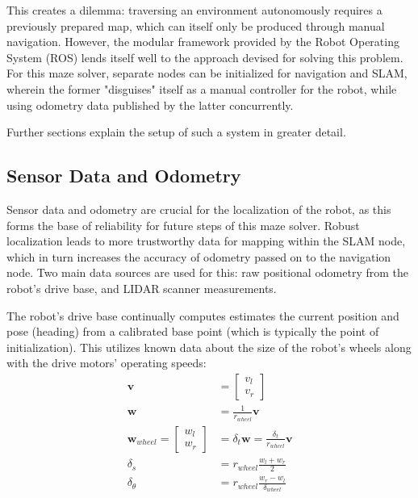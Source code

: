 \documentclass{article}
\begin{document}
This creates a dilemma: traversing an environment autonomously requires a previously prepared map, which can itself only be produced through manual navigation. However, the modular framework provided by the Robot Operating System (ROS) lends itself well to the approach devised for solving this problem. For this maze solver, separate nodes can be initialized for navigation and SLAM, wherein the former "disguises" itself as a manual controller for the robot, while using odometry data published by the latter concurrently.

Further sections explain the setup of such a system in greater detail.

\subsection{Sensor Data and Odometry}

Sensor data and odometry are crucial for the localization of the robot, as this forms the base of reliability for future steps of this maze solver. Robust localization leads to more trustworthy data for mapping within the SLAM node, which in turn increases the accuracy of odometry passed on to the navigation node. Two main data sources are used for this: raw positional odometry from the robot's drive base, and LIDAR scanner measurements. 

The robot's drive base continually computes estimates the current position and pose (heading) from a calibrated base point (which is typically the point of initialization). This utilizes known data about the size of the robot's wheels along with the drive motors' operating speeds:
$$
\begin{aligned}
    \mathbf{v} &= \begin{bmatrix} v_{l} \\ v_{r} \end{bmatrix} \\
    \mathbf{w} &= \frac{1}{r_{wheel}} \mathbf{v} \\
    \mathbf{w}_{wheel} = \begin{bmatrix} w_{l} \\ w_{r} \end{bmatrix} &= \delta_t \mathbf{w} = \frac{\delta_t}{r_{wheel}} \mathbf{v} \\
    \delta_{s} &= r_{wheel} \frac{w_l + w_r}{2} \\
    \delta_{\theta} &= r_{wheel} \frac{w_r - w_l}{\delta_{wheel}}
\end{aligned}
$$
\end{document}
